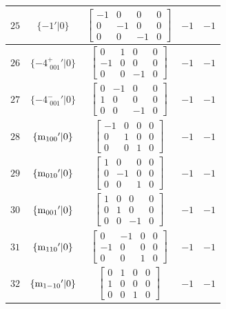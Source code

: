 \documentclass[fleqn,8pt]{jsarticle}
\begin{document}
\begin{longtable}{ccccc}
$ 25 $ & $ \{-1{}'|0\} $ & $ \begin{bmatrix} -1 & 0 & 0 & 0 \\ 0 & -1 & 0 & 0 \\ 0 & 0 & -1 & 0 \end{bmatrix} $ & $ -1 $ & $ -1 $ \\ \hline
$ 26 $ & $ \{-4^{+}_{\,\,001}{}'|0\} $ & $ \begin{bmatrix} 0 & 1 & 0 & 0 \\ -1 & 0 & 0 & 0 \\ 0 & 0 & -1 & 0 \end{bmatrix} $ & $ -1 $ & $ -1 $ \\ \hline
$ 27 $ & $ \{-4^{-}_{\,\,001}{}'|0\} $ & $ \begin{bmatrix} 0 & -1 & 0 & 0 \\ 1 & 0 & 0 & 0 \\ 0 & 0 & -1 & 0 \end{bmatrix} $ & $ -1 $ & $ -1 $ \\ \hline
$ 28 $ & $ \{{\rm m}_{100}{}'|0\} $ & $ \begin{bmatrix} -1 & 0 & 0 & 0 \\ 0 & 1 & 0 & 0 \\ 0 & 0 & 1 & 0 \end{bmatrix} $ & $ -1 $ & $ -1 $ \\ \hline
$ 29 $ & $ \{{\rm m}_{010}{}'|0\} $ & $ \begin{bmatrix} 1 & 0 & 0 & 0 \\ 0 & -1 & 0 & 0 \\ 0 & 0 & 1 & 0 \end{bmatrix} $ & $ -1 $ & $ -1 $ \\ \hline
$ 30 $ & $ \{{\rm m}_{001}{}'|0\} $ & $ \begin{bmatrix} 1 & 0 & 0 & 0 \\ 0 & 1 & 0 & 0 \\ 0 & 0 & -1 & 0 \end{bmatrix} $ & $ -1 $ & $ -1 $ \\ \hline
$ 31 $ & $ \{{\rm m}_{110}{}'|0\} $ & $ \begin{bmatrix} 0 & -1 & 0 & 0 \\ -1 & 0 & 0 & 0 \\ 0 & 0 & 1 & 0 \end{bmatrix} $ & $ -1 $ & $ -1 $ \\ \hline
$ 32 $ & $ \{{\rm m}_{1-10}{}'|0\} $ & $ \begin{bmatrix} 0 & 1 & 0 & 0 \\ 1 & 0 & 0 & 0 \\ 0 & 0 & 1 & 0 \end{bmatrix} $ & $ -1 $ & $ -1 $ \\
\end{longtable}
\end{document}
